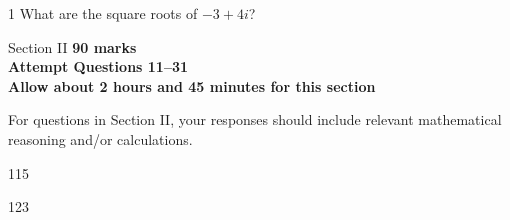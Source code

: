 \documentclass[12pt, a4paper]{article}
\begin{document}
\begin{multi}{1}
    What are the square roots of $-3+4i$?

\end{multi}

\pagebreak

\begin{sectionheader}{Section II}
    {\bfseries
        90 marks\\
        Attempt Questions 11–31\\
        Allow about 2 hours and 45 minutes for this section}

    \vspace{2ex}
    For questions in Section II, your responses should include relevant mathematical reasoning
    and/or calculations.
\end{sectionheader}

\begin{question}{11}{5}


\end{question}

\begin{question}{12}{3}
\end{question}


\blankpage
\end{document}
